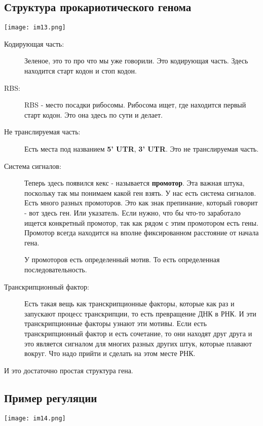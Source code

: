 \subsection{Структура прокариотического генома}   
\texttt{[image: im13.png]}
\begin{description}
\item[Кодирующая часть:]
Зеленое, это то про что 
мы уже говорили. Это кодирующая часть. Здесь 
находится старт кодон и стоп кодон. 

\item[RBS:]
RBS - место посадки рибосомы. Рибосома 
ищет, где находится первый старт кодон. Это она здесь по 
сути и делает. 
\item[Не транслируемая часть:]
Есть места под
названием \textbf{5' UTR}, \textbf{3' UTR}. Это не транслируемая часть. 
\item[Система сигналов:]
Теперь здесь появился кекс - называется \textbf{промотор}. Эта 
важная штука, поскольку так мы понимаем какой ген взять. 
У нас есть система сигналов. Есть много разных 
промоторов. Это как знак препинание, который говорит - вот 
здесь ген. Или указатель. Если нужно, что бы 
что-то заработало ищется конкретный промотор, так
как рядом с этим промотором есть гены. Промотор 
всегда находится на вполне фиксированном расстояние от начала гена. 

У промоторов есть определенный мотив. То есть определенная последовательность. 

\item[Транскрипционный фактор:]
Есть такая вещь как транскрипционные факторы, которые как раз и запускают 
процесс транскрипции, то есть превращение ДНК в РНК. И эти транскрипционные 
факторы узнают эти мотивы. Если есть транскрипционный фактор и
есть сочетание, то они находят друг друга и это является сигналом для многих
разных других штук,
которые плавают вокруг. Что надо прийти и сделать на этом месте РНК.
\end{description}
И это достаточно простая структура гена.   

\subsection{Пример регуляции}
\texttt{[image: im14.png]}

